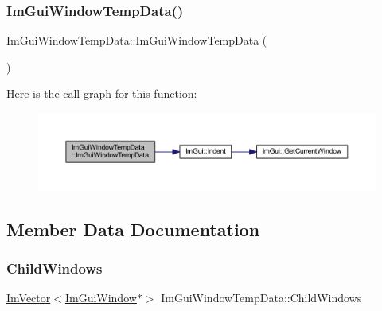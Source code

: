 \subsubsection{\texorpdfstring{Im\+Gui\+Window\+Temp\+Data()}{ImGuiWindowTempData()}}
{\footnotesize\ttfamily Im\+Gui\+Window\+Temp\+Data\+::\+Im\+Gui\+Window\+Temp\+Data (\begin{DoxyParamCaption}{ }\end{DoxyParamCaption})\hspace{0.3cm}{\ttfamily [inline]}}

Here is the call graph for this function\+:
\nopagebreak
\begin{figure}[H]
\begin{center}
\leavevmode
\includegraphics[width=350pt]{struct_im_gui_window_temp_data_a38a3703e2a34a04f7df748ce7085bc2e_cgraph}
\end{center}
\end{figure}


\subsection{Member Data Documentation}
\mbox{\label{struct_im_gui_window_temp_data_ac5ffaaf397b8501b523aa55aa7d34d3d}} 
\subsubsection{\texorpdfstring{Child\+Windows}{ChildWindows}}
{\footnotesize\ttfamily \mbox{\hyperlink{class_im_vector}{Im\+Vector}}$<$\mbox{\hyperlink{struct_im_gui_window}{Im\+Gui\+Window}}$\ast$$>$ Im\+Gui\+Window\+Temp\+Data\+::\+Child\+Windows}

\mbox{\label{struct_im_gui_window_temp_data_af86ba9662f7aeb95c49e785d941f4c69}} 
